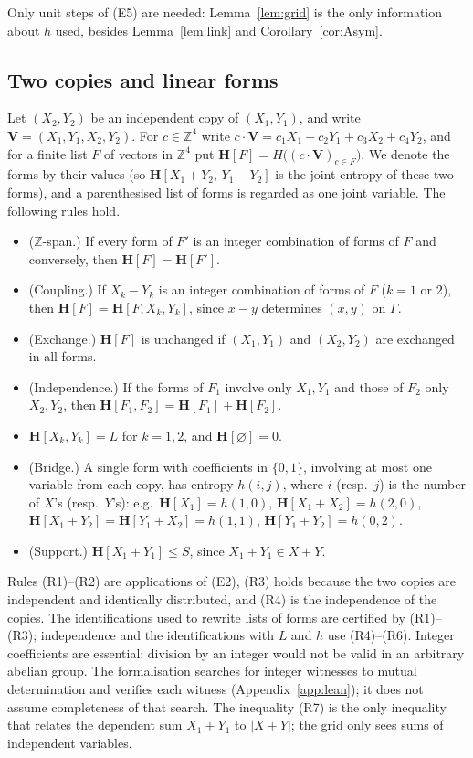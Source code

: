\documentclass[11pt]{amsart}
\theoremstyle{definition}
\theoremstyle{remark}
\numberwithin{equation}{section}
\newcommand{\Z}{\mathbb{Z}}
\newcommand{\Hb}{\mathbf{H}}
\begin{document}
Only unit steps of (E5) are needed: Lemma~\ref{lem:grid} is the only information about $h$ used,
besides Lemma~\ref{lem:link} and Corollary~\ref{cor:Asym}.

\subsection{Two copies and linear forms}\label{subsec:forms}
Let $(X_2,Y_2)$ be an independent copy of $(X_1,Y_1)$, and write $\mathbf{V}=(X_1,Y_1,X_2,Y_2)$.
For $c\in\Z^4$ write $c\cdot\mathbf V=c_1X_1+c_2Y_1+c_3X_2+c_4Y_2$, and for a finite list $F$ of
vectors in $\Z^4$ put $\Hb[F]=H\bigl((c\cdot\mathbf V)_{c\in F}\bigr)$. We denote the forms by their
values (so $\Hb[X_1+Y_2,\,Y_1-Y_2]$ is the joint entropy of these two forms), and a
parenthesised list of forms is regarded as one joint variable. The following rules hold.
\begin{itemize}
\item[(R1)] ($\Z$-span.) If every form of $F'$ is an integer combination of forms of $F$ and
  conversely, then $\Hb[F]=\Hb[F']$.
\item[(R2)] (Coupling.) If $X_k-Y_k$ is an integer combination of forms of $F$ ($k=1$ or $2$),
  then $\Hb[F]=\Hb[F,X_k,Y_k]$, since $x-y$ determines $(x,y)$ on $\Gamma$.
\item[(R3)] (Exchange.) $\Hb[F]$ is unchanged if $(X_1,Y_1)$ and $(X_2,Y_2)$ are exchanged in all
  forms.
\item[(R4)] (Independence.) If the forms of $F_1$ involve only $X_1,Y_1$ and those of $F_2$ only
  $X_2,Y_2$, then $\Hb[F_1,F_2]=\Hb[F_1]+\Hb[F_2]$.
\item[(R5)] $\Hb[X_k,Y_k]=L$ for $k=1,2$, and $\Hb[\varnothing]=0$.
\item[(R6)] (Bridge.) A single form with coefficients in $\{0,1\}$, involving at most one
  variable from each copy, has entropy $h(i,j)$, where $i$ (resp.~$j$) is the number of $X$'s
  (resp.~$Y$'s): e.g.\ $\Hb[X_1]=h(1,0)$, $\Hb[X_1+X_2]=h(2,0)$, $\Hb[X_1+Y_2]=\Hb[Y_1+X_2]=h(1,1)$,
  $\Hb[Y_1+Y_2]=h(0,2)$.
\item[(R7)] (Support.) $\Hb[X_1+Y_1]\le S$, since $X_1+Y_1\in X+Y$.
\end{itemize}
Rules (R1)--(R2) are applications of (E2), (R3) holds because the two copies are
independent and identically distributed, and (R4) is the independence of the copies. The identifications used to rewrite lists of forms are certified by
(R1)--(R3); independence and the identifications with $L$ and $h$ use
(R4)--(R6). Integer coefficients are essential: division by an integer
would not be valid in an arbitrary abelian group. The formalisation
searches for integer witnesses to mutual determination and verifies
each witness (Appendix~\ref{app:lean}); it does not assume completeness
of that search. The inequality (R7) is the only inequality that relates the
dependent sum $X_1+Y_1$ to $|X+Y|$; the grid only sees sums of independent variables.
\end{document}
